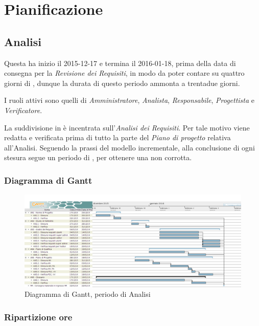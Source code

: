 \section{Pianificazione}
\subsection{Analisi}
Questa  ha inizio il 2015-12-17 e termina il 2016-01-18, prima della data di consegna per la \textit{Revisione dei Requisiti}, in modo da poter contare su quattro giorni di , dunque la durata di questo periodo ammonta a trentadue giorni.

I ruoli attivi sono quelli di \textit{Amministratore}, \textit{Analista}, \textit{Responsabile}, \textit{Progettista} e \textit{Verificatore}.

La suddivisione in  \`e incentrata sull'\textit{Analisi dei Requisiti}. Per tale motivo viene redatta e verificata prima di tutto la parte del \textit{Piano di progetto} relativa all'Analisi. Seguendo la prassi del modello incrementale, alla conclusione di ogni stesura segue un periodo di , per ottenere una  non corrotta.
\subsubsection{Diagramma di Gantt}
\begin{figure}[ht!]
\includegraphics[width=1\textwidth]{res/img/pianificazione/Analisi.png}
\caption{Diagramma di Gantt, periodo di Analisi}
\end{figure}

\subsubsection{Ripartizione ore}

